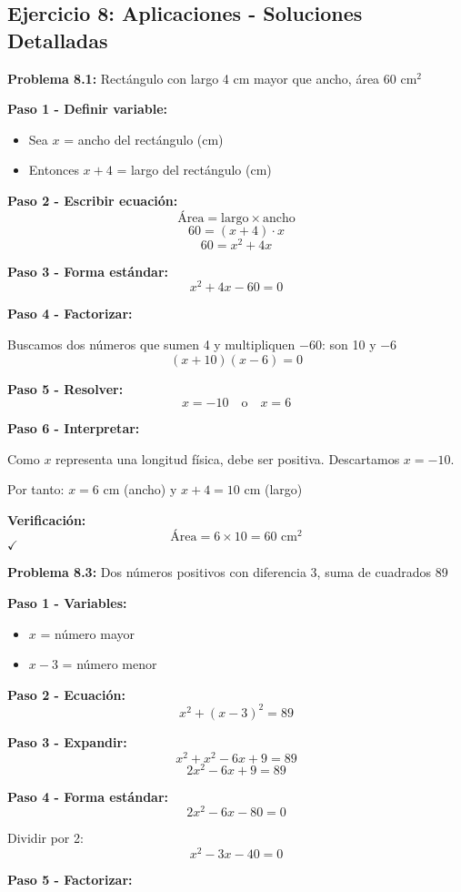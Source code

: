\subsection*{Ejercicio 8: Aplicaciones - Soluciones Detalladas}

\textbf{Problema 8.1:} Rectángulo con largo 4 cm mayor que ancho, área 60 cm$^2$

\textbf{Paso 1 - Definir variable:}
\begin{itemize}
\item Sea $x$ = ancho del rectángulo (cm)
\item Entonces $x + 4$ = largo del rectángulo (cm)
\end{itemize}

\textbf{Paso 2 - Escribir ecuación:}
$$\text{Área} = \text{largo} \times \text{ancho}$$
$$60 = (x+4) \cdot x$$
$$60 = x^2 + 4x$$

\textbf{Paso 3 - Forma estándar:}
$$x^2 + 4x - 60 = 0$$

\textbf{Paso 4 - Factorizar:}

Buscamos dos números que sumen 4 y multipliquen $-60$: son 10 y $-6$
$$(x + 10)(x - 6) = 0$$

\textbf{Paso 5 - Resolver:}
$$x = -10 \quad \text{o} \quad x = 6$$

\textbf{Paso 6 - Interpretar:}

Como $x$ representa una longitud física, debe ser positiva. Descartamos $x = -10$.

Por tanto: $x = 6$ cm (ancho) y $x + 4 = 10$ cm (largo)

\textbf{Verificación:}
$$\text{Área} = 6 \times 10 = 60 \text{ cm}^2$$ $\checkmark$

\textbf{Problema 8.3:} Dos números positivos con diferencia 3, suma de cuadrados 89

\textbf{Paso 1 - Variables:}
\begin{itemize}
\item $x$ = número mayor
\item $x - 3$ = número menor
\end{itemize}

\textbf{Paso 2 - Ecuación:}
$$x^2 + (x-3)^2 = 89$$

\textbf{Paso 3 - Expandir:}
$$x^2 + x^2 - 6x + 9 = 89$$
$$2x^2 - 6x + 9 = 89$$

\textbf{Paso 4 - Forma estándar:}
$$2x^2 - 6x - 80 = 0$$

Dividir por 2:
$$x^2 - 3x - 40 = 0$$

\textbf{Paso 5 - Factorizar:}

